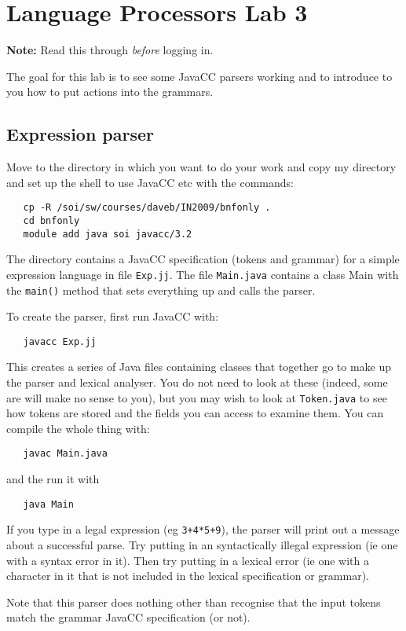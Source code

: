 \documentclass{article}
\begin{document}
\section*{Language Processors Lab 3}

{\bf Note:} Read this through {\em before\/} logging in.

\medskip\noindent The goal for this
lab is to see some JavaCC parsers working and
to introduce to you how to put actions into the grammars.

\subsection*{Expression parser}

Move to the directory in which you want to do
your work and copy my directory and set up the shell to 
use JavaCC etc with the commands:
\begin{verbatim}
   cp -R /soi/sw/courses/daveb/IN2009/bnfonly .
   cd bnfonly
   module add java soi javacc/3.2
\end{verbatim}
The directory contains a JavaCC specification (tokens and grammar) 
for a simple expression language in file \verb+Exp.jj+. 
The file \verb+Main.java+ contains a class Main 
with the \verb+main()+ method that sets 
everything up and calls the parser. 

To create the parser, first run JavaCC with:
\begin{verbatim}
   javacc Exp.jj
\end{verbatim}
This creates a series of Java files containing classes that
together go to make up the parser and lexical analyser.
You do not need to look at these (indeed, some are will make no sense to you),
but you may wish to look at \verb+Token.java+ to see how tokens are
stored and the fields you can access to examine them.
You can compile the whole thing with:
\begin{verbatim}
   javac Main.java
\end{verbatim}
and the run it with
\begin{verbatim}
   java Main
\end{verbatim}
If you type in a legal expression (eg \verb=3+4*5+9=), the parser will
print out a message about a successful parse. 
Try putting in an syntactically illegal expression 
(ie one with a syntax error in it). Then try putting in 
a lexical error (ie one with a character in it that is not included
in the lexical specification or grammar).

Note that this parser does nothing other than recognise that the input
tokens match the grammar JavaCC specification (or not). 
\end{document}
